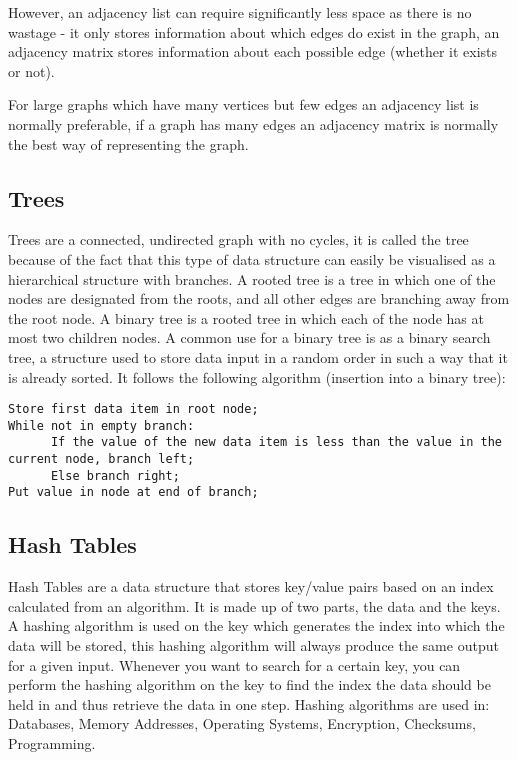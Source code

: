   However, an adjacency list can require significantly less space as there is no wastage - it only stores information about which edges do exist in the graph, an adjacency matrix stores information about each possible edge (whether it exists or not).

  For large graphs which have many vertices but few edges an adjacency list is normally preferable, if a graph has many edges an adjacency matrix is normally the best way of representing the graph.


\subsection{Trees}

  Trees are a connected, undirected graph with no cycles, it is called the tree because of the fact that this type of data structure can easily be visualised as a hierarchical structure with branches. A rooted tree is a tree in which one of the nodes are designated from the roots, and all other edges are branching away from the root node. A binary tree is a rooted tree in which each of the node has at most two children nodes. A common use for a binary tree is as a binary search tree, a structure used to store data input in a random order in such a way that it is already sorted. It follows the following algorithm (insertion into a binary tree):
\begin{verbatim}Store first data item in root node;
While not in empty branch:
      If the value of the new data item is less than the value in the current node, branch left;
      Else branch right;
Put value in node at end of branch;\end{verbatim}
\subsection{Hash Tables}

  Hash Tables are a data structure that stores key/value pairs based on an index calculated from an algorithm. It is made up of two parts, the data and the keys. A hashing algorithm is used on the key which generates the index into which the data will be stored, this hashing algorithm will always produce the same output for a given input. Whenever you want to search for a certain key, you can perform the hashing algorithm on the key to find the index the data should be held in and thus retrieve the data in one step. Hashing algorithms are used in: Databases, Memory Addresses, Operating Systems, Encryption, Checksums, Programming.

